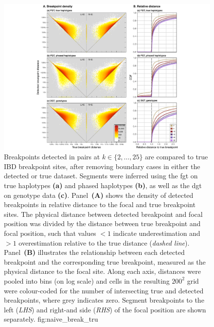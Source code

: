

\begin{figure}[!htbp]
\includegraphics[width=\textwidth]{./img/ch3/naive_break_tru.pdf}
{Breakpoints detected in \fk{} pairs at ${k \in \lbrace 2, \ldots, 25 \rbrace}$ are compared to true IBD breakpoint sites, after removing boundary cases in either the detected or true dataset.
Segments were inferred using the \gls{fgt} on true haplotypes \textbf{(a)} and phased haplotypes \textbf{(b)}, as well as the \gls{dgt} on genotype data \textbf{(c)}.
Panel~\textbf{(A)} shows the density of detected breakpoints in relative distance to the focal and true breakpoint sites.
The physical distance between detected breakpoint and focal position was divided by the distance between true breakpoint and focal position, such that values $<1$ indicate underestimation and $>1$ overestimation relative to the true distance (\emph{dashed line}).
Panel~\textbf{(B)} illustrates the relationship between each detected breakpoint and the corresponding true breakpoint, measured as the physical distance to the focal site.
Along each axis, distances were pooled into  bins (on log scale)
and cells in the resulting $200^2$ grid were colour-coded for the number of  intersecting true and detected breakpoints, where grey indicates zero.
Segment breakpoints to the left (\emph{LHS}) and right-and side (\emph{RHS}) of the focal position are shown separately.}
{fig:naive_break_tru}
\end{figure}
